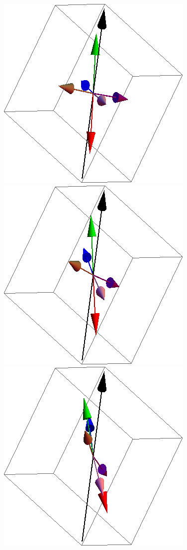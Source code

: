 \documentclass{article}
\begin{document}
\begin{figure}[ht]
\includegraphics[scale=0.27]{4S005to000R.png}
\includegraphics[scale=0.27]{5S005to000R.png}
\includegraphics[scale=0.27]{6S005to000R.png}

\end{figure}
\end{document}
